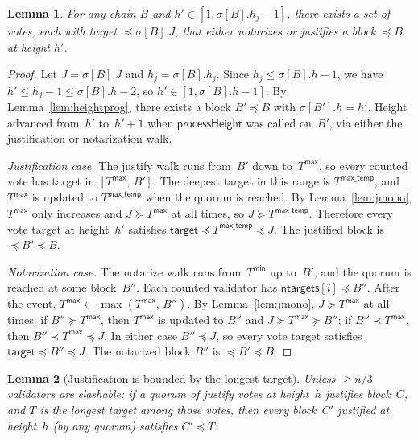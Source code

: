 \ifx\litemode\undefined\documentclass{article}\fi
\newcommand{\ntargets}{\mathsf{ntargets}}
\theoremstyle{plain}
\newtheorem{lemma}{Lemma}
\theoremstyle{definition}
\theoremstyle{remark}
\begin{document}
\begin{lemma}\label{lem:witnessed}
  For any chain $B$ and $h' \in [1, \sigma[B].h_j-1]$, there exists a set of votes, each with target $\preceq \sigma[B].J$, that either notarizes or justifies a block $\preceq B$ at height $h'$.
\end{lemma}

\begin{proof}
Let $J = \sigma[B].J$ and $h_j = \sigma[B].h_j$.
Since $h_j \leq \sigma[B].h - 1$, we have $h' \leq h_j - 1 \leq \sigma[B].h - 2$, so $h' \in [1, \sigma[B].h - 1]$.
By Lemma~\ref{lem:heightprog}, there exists a block $B' \preceq B$ with $\sigma[B'].h = h'$.
Height advanced from~$h'$ to~$h'+1$ when $\textsf{processHeight}$ was called on~$B'$, via either the justification or notarization walk.

\emph{Justification case.}
The justify walk runs from~$B'$ down to~$T^\mathsf{max}$, so every counted vote has target in $[T^\mathsf{max},\, B']$.
The deepest target in this range is $T^\mathsf{max\_temp}$, and $T^\mathsf{max}$ is updated to $T^\mathsf{max\_temp}$ when the quorum is reached.
By Lemma~\ref{lem:jmono}, $T^\mathsf{max}$ only increases and $J \succeq T^\mathsf{max}$ at all times, so $J \succeq T^\mathsf{max\_temp}$.
Therefore every vote target at height~$h'$ satisfies $\mathsf{target} \preceq T^\mathsf{max\_temp} \preceq J$.
The justified block is $\preceq B' \preceq B$.

\emph{Notarization case.}
The notarize walk runs from~$T^\mathsf{min}$ up to~$B'$, and the quorum is reached at some block~$B''$.
Each counted validator has $\ntargets[i] \preceq B''$.
After the event, $T^\mathsf{max} \gets \max(T^\mathsf{max},\, B'')$.
By Lemma~\ref{lem:jmono}, $J \succeq T^\mathsf{max}$ at all times: if $B'' \succeq T^\mathsf{max}$, then $T^\mathsf{max}$ is updated to $B''$ and $J \succeq T^\mathsf{max} \succeq B''$; if $B'' \prec T^\mathsf{max}$, then $B'' \prec T^\mathsf{max} \preceq J$.
In either case $B'' \preceq J$, so every vote target satisfies $\mathsf{target} \preceq B'' \preceq J$.
The notarized block $B''$ is $\preceq B' \preceq B$.
\end{proof}

\begin{lemma}[Justification is bounded by the longest target]\label{lem:justbound}
Unless $\geq n/3$ validators are slashable: if a quorum of justify votes at height~$h$ justifies block~$C$, and $T$ is the longest target among those votes, then every block~$C'$ justified at height~$h$ (by any quorum) satisfies $C' \preceq T$.
\end{lemma}
\end{document}
